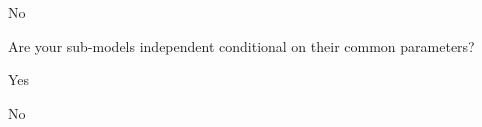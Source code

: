 \documentclass{article}
\begin{document}
\begin{tree}
\begin{tree}
\begin{tree}
        \end{tree}
        \item No
        \begin{tree}
        \item Are your sub-models independent conditional on their common parameters?
        \begin{tree}
            \item Yes
            \begin{tree}
                \item 
            \end{tree}
            \item No
        \end{tree}
        \end{tree}
    \end{tree}
\end{tree}
\end{document}
